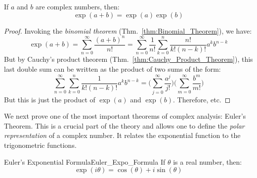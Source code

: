     \begin{theorem}
        \label{thm:Expo_Product_Formula}%
        If $a$ and $b$ are complex numbers, then:
        \begin{equation}
            \exp(a+b)=\exp(a)\exp(b)
        \end{equation}
    \end{theorem}
    \begin{proof}
        Invoking the \textit{binomial theorem}
        (Thm.~\ref{thm:Binomial_Theorem}), we have:
        \begin{equation}
            \exp(a+b)=\sum_{n=0}^{\infty}\frac{(a+b)^{n}}{n!}
                     =\sum_{n=0}^{\infty}\frac{1}{n!}
                      \sum_{k=0}^{n}\frac{n!}{k!(n-k)!}a^{k}b^{n-k}
        \end{equation}
        But by Cauchy's product theorem
        (Thm.~\ref{thm:Cauchy_Product_Theorem}), this last double
        sum can be written as the product of two sums of the form:
        \begin{equation}
            \sum_{n=0}^{\infty}\sum_{k=0}^{n}
                \frac{1}{k!(n-k)!}a^{k}b^{n-k}
                =\Big(\sum_{j=0}^{\infty}\frac{a^{j}}{j!}\Big)
                 \Big(\sum_{m=0}^{\infty}\frac{b^{m}}{m!}\Big)
        \end{equation}
        But this is just the product of $\exp(a)$
        and $\exp(b)$. Therefore, etc.
    \end{proof}
    We next prove one of the most important theorems of complex analysis:
    Euler's Theorem. This is a crucial part of the theory and allows
    one to define the \textit{polar representation} of a complex number.
    It relates the exponential function to the trigonometric functions.
    \newpage
    \begin{ftheorem}{Euler's Exponential Formula}{Euler_Expo_Formula}
        If $\theta$ is a real number, then:
        \begin{equation}
            \exp(i\theta)=\cos(\theta)+i\sin(\theta)
        \end{equation}
    \end{ftheorem}
